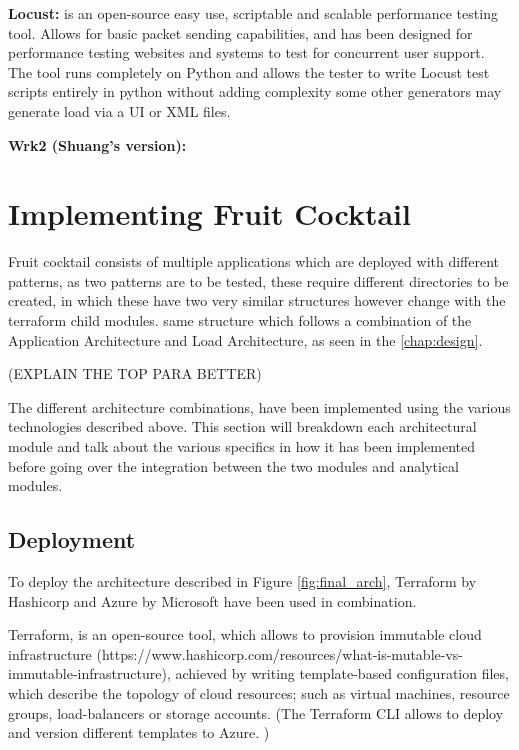 \textbf{Locust: }is an open-source easy use, scriptable and scalable performance testing tool. Allows for basic packet sending capabilities, and has been designed for performance testing websites and systems to test for concurrent user support. The tool runs completely on Python and allows the tester to write Locust test scripts entirely in python without adding complexity some other generators may generate load via a UI or XML files. 


\textbf{Wrk2 (Shuang's version): }




\section{Implementing Fruit Cocktail}
Fruit cocktail consists of multiple applications which are deployed with different patterns, as two patterns are to be tested, these require different directories to be created, in which these have two very similar structures however change with the terraform child modules. same structure which follows a combination of the Application Architecture and Load Architecture, as seen in the \autoref{chap:design}. 

(EXPLAIN THE TOP PARA BETTER)

The different architecture combinations, have been implemented using the various technologies described above. This section will breakdown each architectural module and talk about the various specifics in how it has been implemented before going over the integration between the two modules and analytical modules. 

\subsection{Deployment}

To deploy the architecture described in Figure \ref{fig:final_arch}, Terraform by Hashicorp and Azure by Microsoft have been used in combination.


Terraform, is an open-source tool, which allows to provision immutable cloud infrastructure (https://www.hashicorp.com/resources/what-is-mutable-vs-immutable-infrastructure),  achieved by writing template-based configuration files, which describe the topology of cloud resources; such as virtual machines, resource groups, load-balancers or storage accounts. (The Terraform CLI allows to deploy and version different templates to Azure.  )

